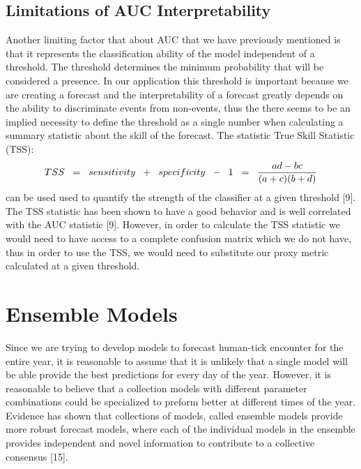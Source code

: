 \subsection{Limitations of AUC Interpretability}
\noindent Another limiting factor that about AUC that we have previously mentioned is that it represents the classification ability of the model independent of a threshold. The threshold determines the minimum probability that will be considered a presence. In our application this threshold is important because we are creating a forecast and the interpretability of a forecast greatly depends on the ability to discriminate events from non-events, thus the there seems to be an implied necessity to define the threshold as a single number when calculating a summary statistic about the skill of the forecast. The statistic True Skill Statistic (TSS):
\begin{equation}
TSS \hspace{0.2cm} = \hspace{0.2cm} sensitivity \hspace{0.2cm} + \hspace{0.2cm} specificity\hspace{0.2cm}  -\hspace{0.2cm} 1 \hspace{0.2cm} =  \hspace{0.2cm} \frac{ad -bc}{(a+c)(b+d)}
\end{equation}
can be used used to quantify the strength of the classifier at a given threshold [9]. The TSS statistic has been shown to have a good behavior and is well correlated with the AUC statistic [9]. However, in order to calculate the TSS statistic we would need to have access to a complete confusion matrix which we do not have, thus in order to use the TSS, we would need to substitute our proxy metric calculated at a given threshold. \newline




\section{Ensemble Models}

Since we are trying to develop models to forecast human-tick encounter for the entire year, it is reasonable to assume that it is unlikely that a single model will be able provide the best predictions for every day of the year. However, it is reasonable to believe that a collection models with different parameter combinations could be specialized to preform better at different times of the year. Evidence has shown that collections of models, called ensemble models provide more robust forecast models, where each of the individual models in the ensemble provides independent and novel information to contribute to a collective consensus [15]. \newline

